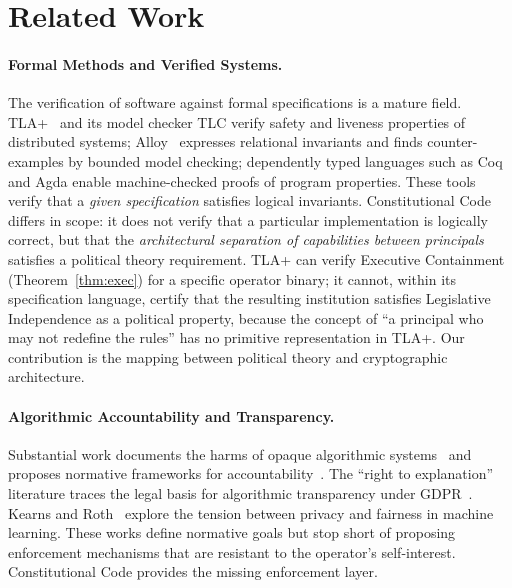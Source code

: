 \section{Related Work}
\label{sec:related}

\paragraph{Formal Methods and Verified Systems.}
The verification of software against formal specifications is a
mature field. TLA+~\cite{lamport2002} and its model
checker TLC verify safety and liveness properties of distributed
systems; Alloy~\cite{jackson2012} expresses relational invariants
and finds counter-examples by bounded model checking;
dependently typed languages such as Coq~\cite{bertot2004} and
Agda enable machine-checked proofs of program properties. These
tools verify that a \emph{given specification} satisfies logical
invariants. Constitutional Code differs in scope: it does not verify
that a particular implementation is logically correct, but that the
\emph{architectural separation of capabilities between principals}
satisfies a political theory requirement. TLA+ can verify Executive
Containment (Theorem~\ref{thm:exec}) for a specific operator binary;
it cannot, within its specification language, certify that the
resulting institution satisfies Legislative Independence as a
political property, because the concept of ``a principal who may
not redefine the rules'' has no primitive representation in TLA+.
Our contribution is the mapping between political theory and
cryptographic architecture.

\paragraph{Algorithmic Accountability and Transparency.}
Substantial work documents the harms of opaque algorithmic
systems~\cite{pasquale2015,obermeyer2019dissecting} and proposes
normative frameworks for accountability~\cite{doshi2017,
wachter2017}. The ``right to explanation'' literature traces the
legal basis for algorithmic transparency under
GDPR~\cite{wachter2017}. Kearns and Roth~\cite{kearns2019ethical}
explore the tension between privacy and fairness in machine
learning. These works define normative goals but stop short of
proposing enforcement mechanisms that are resistant to the
operator's self-interest. Constitutional Code provides the missing
enforcement layer.

